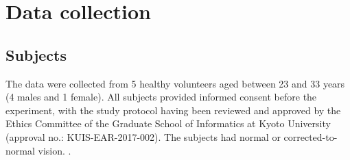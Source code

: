 \section{Data collection}



\subsection{Subjects}
The data were collected from 5 healthy volunteers aged between 23 and 33 years (4 males and 1 female). All subjects provided informed consent before the experiment, with the study protocol having been reviewed and approved by the Ethics Committee of the Graduate School of Informatics at Kyoto University (approval no.: KUIS{-}EAR{-}2017{-}002). The subjects had normal or corrected-to-normal vision. .

